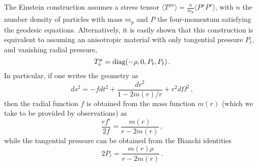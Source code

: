 \documentclass[twocolumn,preprintnumbers,nofootinbib,prd,superscriptaddress,aps]{revtex4-1}
\def\be{\begin{equation}}
\def\ee{\end{equation}}
\def\be{\begin{equation}}
\def\ee{\end{equation}}
\begin{document}
The Einstein construction assumes a stress tensor $\langle T^{\mu\nu}\rangle=\frac{n}{m_p}\langle P^{\mu}P^{\nu}\rangle$, with $n$ the number density of particles with mass $m_p$ and $P$ the four-momentum satisfying the geodesic equations. Alternatively, it is easily shown that this construction is equivalent to assuming an anisotropic material with only tangential pressure $P_t$, and vanishing radial pressure, 
%
\be
T^\mu_\nu={\rm diag}(-\rho,0,P_t,P_t)\,.
\ee 
%
In particular, if one writes the geometry as
%
\be
ds^2=-fdt^2+\frac{dr^2}{1-2m(r)/r}+r^2d\Omega^2\,,
\label{eq:Spherical}
\ee
% 
then the radial function $f$ is obtained from the mass function $m(r)$ (which we take to be provided by observations) as
%
\be
\frac{rf'}{2f}=\frac{m(r)}{r-2m(r)}\,,\label{eq_metric}
\ee
%
while the tangential pressure can be obtained from the Bianchi identities
%
\be
2P_t=\frac{m(r)\rho}{r-2m(r)}\,.
\ee
%
\end{document}
